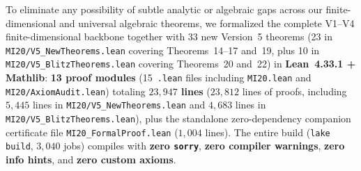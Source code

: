 \documentclass[10pt,letterpaper]{article}
\begin{document}
To eliminate any possibility of subtle analytic or algebraic gaps across our finite-dimensional and universal algebraic theorems, we formalized the complete V1--V4 finite-dimensional backbone together with 33 new Version~5 theorems (23 in \texttt{MI20/V5\_NewTheorems.lean} covering Theorems~14--17 and~19, plus 10 in \texttt{MI20/V5\_BlitzTheorems.lean} covering Theorems~20 and~22) in \textbf{Lean~4.33.1 + Mathlib}: \textbf{13 proof modules} (15~\texttt{.lean} files including \texttt{MI20.lean} and \texttt{MI20/AxiomAudit.lean}) totaling \textbf{$23{,}947$ lines} ($23{,}812$ lines of proofs, including $5{,}445$ lines in \texttt{MI20/V5\_NewTheorems.lean} and $4{,}683$ lines in \texttt{MI20/V5\_BlitzTheorems.lean}), plus the standalone zero-dependency companion certificate file \texttt{MI20\_FormalProof.lean} ($1{,}004$ lines). The entire build (\texttt{lake build}, $3{,}040$ jobs) compiles with \textbf{zero \texttt{sorry}}, \textbf{zero compiler warnings}, \textbf{zero info hints}, and \textbf{zero custom axioms}.
\end{document}
